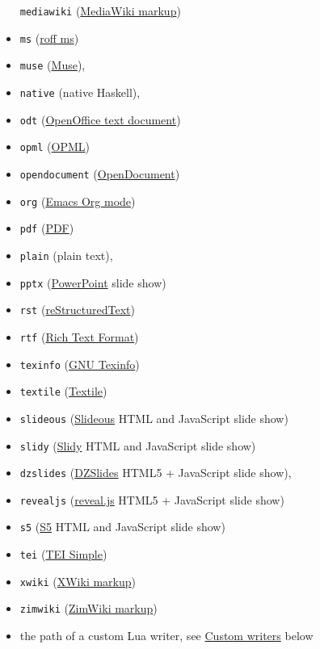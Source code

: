 \documentclass[]{article}
\begin{document}
\begin{description}
\begin{itemize}
  \texttt{mediawiki}
  (\href{https://www.mediawiki.org/wiki/Help:Formatting}{MediaWiki
  markup})
\item
  \texttt{ms} (\href{https://man.cx/groff_ms(7)}{roff ms})
\item
  \texttt{muse} (\href{https://amusewiki.org/library/manual}{Muse}),
\item
  \texttt{native} (native Haskell),
\item
  \texttt{odt}
  (\href{https://en.wikipedia.org/wiki/OpenDocument}{OpenOffice text
  document})
\item
  \texttt{opml} (\href{http://dev.opml.org/spec2.html}{OPML})
\item
  \texttt{opendocument}
  (\href{http://opendocument.xml.org}{OpenDocument})
\item
  \texttt{org} (\href{https://orgmode.org}{Emacs Org mode})
\item
  \texttt{pdf} (\href{https://www.adobe.com/pdf/}{PDF})
\item
  \texttt{plain} (plain text),
\item
  \texttt{pptx}
  (\href{https://en.wikipedia.org/wiki/Microsoft_PowerPoint}{PowerPoint}
  slide show)
\item
  \texttt{rst}
  (\href{https://docutils.sourceforge.io/docs/ref/rst/introduction.html}{reStructuredText})
\item
  \texttt{rtf}
  (\href{https://en.wikipedia.org/wiki/Rich_Text_Format}{Rich Text
  Format})
\item
  \texttt{texinfo} (\href{https://www.gnu.org/software/texinfo/}{GNU
  Texinfo})
\item
  \texttt{textile} (\href{https://www.promptworks.com/textile}{Textile})
\item
  \texttt{slideous}
  (\href{https://goessner.net/articles/slideous/}{Slideous} HTML and
  JavaScript slide show)
\item
  \texttt{slidy} (\href{https://www.w3.org/Talks/Tools/Slidy2/}{Slidy}
  HTML and JavaScript slide show)
\item
  \texttt{dzslides} (\href{http://paulrouget.com/dzslides/}{DZSlides}
  HTML5 + JavaScript slide show),
\item
  \texttt{revealjs} (\href{https://revealjs.com/}{reveal.js} HTML5 +
  JavaScript slide show)
\item
  \texttt{s5} (\href{https://meyerweb.com/eric/tools/s5/}{S5} HTML and
  JavaScript slide show)
\item
  \texttt{tei} (\href{https://github.com/TEIC/TEI-Simple}{TEI Simple})
\item
  \texttt{xwiki}
  (\href{https://www.xwiki.org/xwiki/bin/view/Documentation/UserGuide/Features/XWikiSyntax/}{XWiki
  markup})
\item
  \texttt{zimwiki}
  (\href{https://zim-wiki.org/manual/Help/Wiki_Syntax.html}{ZimWiki
  markup})
\item
  the path of a custom Lua writer, see
  \protect\hyperlink{custom-writers}{Custom writers} below
\end{itemize}


\end{description}
\end{document}

